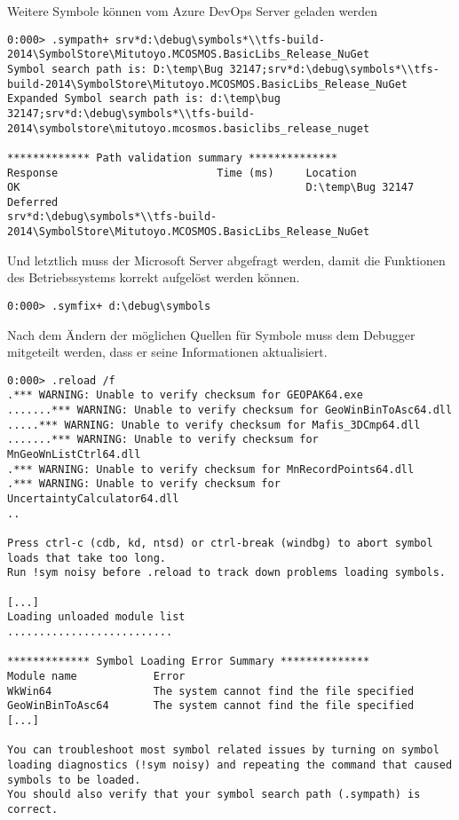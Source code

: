 Weitere Symbole können vom Azure DevOps Server geladen werden
\begin{lstlisting}[language=WinDbg]
0:000> .sympath+ srv*d:\debug\symbols*\\tfs-build-2014\SymbolStore\Mitutoyo.MCOSMOS.BasicLibs_Release_NuGet
Symbol search path is: D:\temp\Bug 32147;srv*d:\debug\symbols*\\tfs-build-2014\SymbolStore\Mitutoyo.MCOSMOS.BasicLibs_Release_NuGet
Expanded Symbol search path is: d:\temp\bug 32147;srv*d:\debug\symbols*\\tfs-build-2014\symbolstore\mitutoyo.mcosmos.basiclibs_release_nuget

************* Path validation summary **************
Response                         Time (ms)     Location
OK                                             D:\temp\Bug 32147
Deferred                                       srv*d:\debug\symbols*\\tfs-build-2014\SymbolStore\Mitutoyo.MCOSMOS.BasicLibs_Release_NuGet
\end{lstlisting}

Und letztlich muss der Microsoft Server abgefragt werden, damit die Funktionen des Betriebssystems korrekt aufgelöst werden können.
\begin{lstlisting}[language=WinDbg]
0:000> .symfix+ d:\debug\symbols
\end{lstlisting}

Nach dem Ändern der möglichen Quellen für Symbole muss dem Debugger mitgeteilt werden, dass er seine Informationen aktualisiert.

\begin{lstlisting}
0:000> .reload /f
.*** WARNING: Unable to verify checksum for GEOPAK64.exe
.......*** WARNING: Unable to verify checksum for GeoWinBinToAsc64.dll
.....*** WARNING: Unable to verify checksum for Mafis_3DCmp64.dll
.......*** WARNING: Unable to verify checksum for MnGeoWnListCtrl64.dll
.*** WARNING: Unable to verify checksum for MnRecordPoints64.dll
.*** WARNING: Unable to verify checksum for UncertaintyCalculator64.dll
..

Press ctrl-c (cdb, kd, ntsd) or ctrl-break (windbg) to abort symbol loads that take too long.
Run !sym noisy before .reload to track down problems loading symbols.

[...]
Loading unloaded module list
..........................

************* Symbol Loading Error Summary **************
Module name            Error
WkWin64                The system cannot find the file specified
GeoWinBinToAsc64       The system cannot find the file specified
[...]

You can troubleshoot most symbol related issues by turning on symbol loading diagnostics (!sym noisy) and repeating the command that caused symbols to be loaded.
You should also verify that your symbol search path (.sympath) is correct.
\end{lstlisting}

